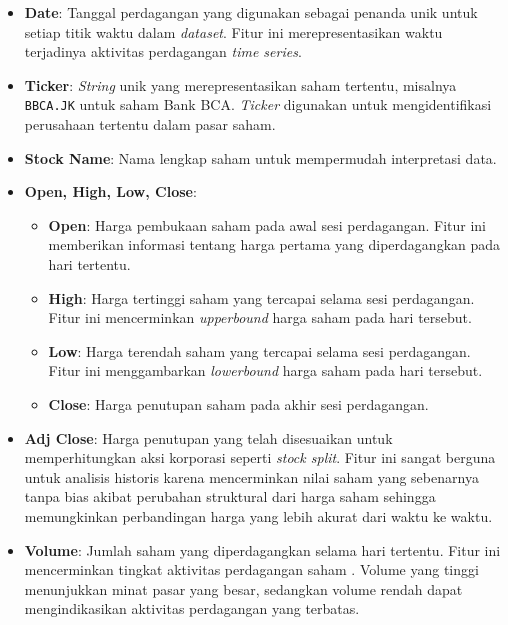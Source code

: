 \begin{itemize}
    \item \textbf{Date}: 
    Tanggal perdagangan yang digunakan sebagai penanda unik untuk setiap titik waktu dalam \textit{dataset}. 
    Fitur ini merepresentasikan waktu terjadinya aktivitas perdagangan \textit{time series}. 
    
    \item \textbf{Ticker}: 
    \textit{String} unik yang merepresentasikan saham tertentu, misalnya \texttt{BBCA.JK} untuk saham Bank BCA. \textit{Ticker} digunakan untuk mengidentifikasi perusahaan tertentu dalam pasar saham.
    \item \textbf{Stock Name}: 
    Nama lengkap saham untuk mempermudah interpretasi data. 
    
    \item \textbf{Open, High, Low, Close}: 
    \begin{itemize}
        \item \textbf{Open}: Harga pembukaan saham pada awal sesi perdagangan. 
        Fitur ini memberikan informasi tentang harga pertama yang diperdagangkan pada hari tertentu.
        \item \textbf{High}: Harga tertinggi saham yang tercapai selama sesi perdagangan. 
        Fitur ini mencerminkan \textit{upperbound} harga saham pada hari tersebut.
        \item \textbf{Low}: Harga terendah saham yang tercapai selama sesi perdagangan. 
        Fitur ini menggambarkan \textit{lowerbound} harga saham pada hari tersebut.
        \item \textbf{Close}: Harga penutupan saham pada akhir sesi perdagangan. 
    \end{itemize}
    
    \item \textbf{Adj Close}: 
    Harga penutupan yang telah disesuaikan untuk memperhitungkan aksi korporasi seperti \textit{stock split}. 
    Fitur ini sangat berguna untuk analisis historis karena mencerminkan nilai saham yang sebenarnya tanpa bias akibat perubahan struktural dari harga saham sehingga memungkinkan perbandingan harga yang lebih akurat dari waktu ke waktu.
    
    \item \textbf{Volume}: 
    Jumlah saham yang diperdagangkan selama hari tertentu. 
    Fitur ini mencerminkan tingkat aktivitas perdagangan saham . Volume yang tinggi menunjukkan minat pasar yang besar, sedangkan volume rendah dapat mengindikasikan aktivitas perdagangan yang terbatas.
\end{itemize}


